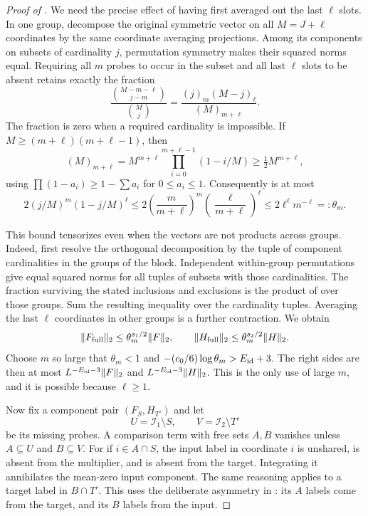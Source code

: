 \begin{proof}[Proof of ]
We need the precise effect of having first averaged out the
last $\ell$ slots.  In one group, decompose the original
symmetric vector on all $M=J+\ell$ coordinates by the same
coordinate averaging projections.  Among its components on
subsets of cardinality $j$, permutation symmetry makes their
squared norms equal.  Requiring all $m$ probes to occur in
the subset and all last $\ell$ slots to be absent retains
exactly the fraction
\begin{equation}\label{eq:ideal-hoeffding-fraction}
 \frac{\binom{M-m-\ell}{j-m}}{\binom Mj}
 =\frac{(j)_m(M-j)_\ell}{(M)_{m+\ell}}.
\end{equation}
The fraction is zero when a required cardinality is
impossible.  If $M\geq(m+\ell)(m+\ell-1)$, then
\[
 (M)_{m+\ell}
 =M^{m+\ell}\prod_{i=0}^{m+\ell-1}(1-i/M)
 \geq\tfrac12M^{m+\ell},
\]
using $\prod(1-a_i)\geq1-\sum a_i$ for $0\leq a_i\leq1$.
Consequently  is at most
\begin{equation}\label{eq:ideal-hoeffding-bound}
 2(j/M)^m(1-j/M)^\ell
 \leq2\left(\frac m{m+\ell}\right)^m
          \left(\frac\ell{m+\ell}\right)^\ell
 \leq 2\ell^\ell m^{-\ell}=:\theta_m.
\end{equation}

This bound tensorizes even when the vectors are not products
across groups.  Indeed, first resolve the orthogonal
decomposition by the tuple of component cardinalities in
the groups of the block.  Independent within-group
permutations give equal squared norms for all tuples of
subsets with those cardinalities.  The fraction surviving
the stated inclusions and exclusions is the product of
 over those groups.  Sum
the resulting inequality over the cardinality tuples.
Averaging the last $\ell$ coordinates in other groups is
a further contraction.  We obtain
\begin{equation}\label{eq:ideal-full-component}
 \lVert F_{\rm full}\rVert_2\leq\theta_m^{s_1/2}\lVert F\rVert_2,
 \qquad
 \lVert H_{\rm full}\rVert_2\leq\theta_m^{s_2/2}\lVert H\rVert_2.
\end{equation}
Choose $m$ so large that $\theta_m<1$ and
$-(c_0/6)\log\theta_m>E_{\rm id}+3$.
The right sides are then at most
$L^{-E_{\rm id}-3}\lVert F\rVert_2$ and
$L^{-E_{\rm id}-3}\lVert H\rVert_2$.  This is the only use of
large $m$, and it is possible because $\ell\geq1$.

Now fix a component pair $(F_S,H_{T'})$ and let
\[
 U=\mathcal I_1\setminus S,
 \qquad V=\mathcal I_2\setminus T'
\]
be its missing probes.  A comparison term with free sets
$A,B$ vanishes unless $A\subseteq U$ and $B\subseteq V$.
For if $i\in A\cap S$, the input label in coordinate $i$
is unshared, is absent from the multiplier, and is absent
from the target.  Integrating it annihilates the mean-zero
input component.  The same reasoning applies to a target
label in $B\cap T'$.  This uses the deliberate asymmetry in
: its $A$ labels come
from the target, and its $B$ labels from the input.


\end{proof}
